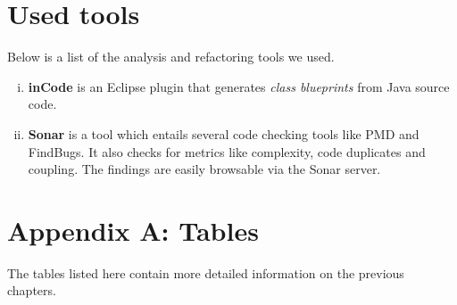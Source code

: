 \documentclass[a4paper, 10pt]{article}
\begin{document}
\newpage
\section{Used tools}
\label{sec:used_tools}

Below is a list of the analysis and refactoring tools we used.


\begin{enumerate}[i)]
\item \textbf{inCode} is an Eclipse plugin that generates \emph{class
    blueprints} from Java source code.
\item \textbf{Sonar}
	is a tool which entails several code checking tools like PMD and FindBugs. It also checks for metrics like complexity, code duplicates and coupling.
	The findings are easily browsable via the Sonar server.
\end{enumerate}



\section{Appendix A: Tables}
The tables listed here contain more detailed information on the
previous chapters.
\end{document}
